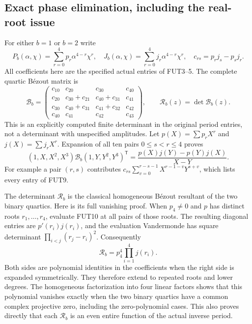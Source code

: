 \subsection{Exact phase elimination, including the real-root issue}
For either $b=1$ or $b=2$ write
\[
 P_b(\alpha,\chi)=\sum_{r=0}^4p_r\alpha^{4-r}\chi^r,
 \quad J_b(\alpha,\chi)=\sum_{r=0}^4j_r\alpha^{4-r}\chi^r,
 \quad c_{rs}=p_rj_s-p_sj_r.
 \tag{FUT8}
\]
All coefficients here are the specified actual entries of FUT3--5.
The complete quartic B\'ezout matrix is
\[
 \mathcal B_b=
 \begin{pmatrix}
 c_{10}&c_{20}&c_{30}&c_{40}\\
 c_{20}&c_{30}+c_{21}&c_{40}+c_{31}&c_{41}\\
 c_{30}&c_{40}+c_{31}&c_{41}+c_{32}&c_{42}\\
 c_{40}&c_{41}&c_{42}&c_{43}
 \end{pmatrix},\qquad
 \mathscr R_b(z)=\det\mathcal B_b(z).
 \tag{FUT9}
\]
This is an explicitly computed finite determinant in the original
period entries, not a determinant with unspecified amplitudes.
Let $p(X)=\sum p_rX^r$ and $j(X)=\sum j_rX^r$.
Expansion of all ten pairs $0\le s<r\le4$ proves
\[
 (1,X,X^2,X^3)\mathcal B_b(1,Y,Y^2,Y^3)^{\mathsf T}
       =\frac{p(X)j(Y)-p(Y)j(X)}{X-Y}.
 \tag{FUT10}
\]
For example a pair $(r,s)$ contributes
$c_{rs}\sum_{v=0}^{r-s-1}X^{r-1-v}Y^{s+v}$,
which lists every entry of FUT9.

The determinant $\mathscr R_b$ is the classical homogeneous B\'ezout
resultant of the two binary quartics. Here is its full vanishing proof.
When $p_4\ne0$ and $p$ has distinct roots $r_1,\ldots,r_4$,
evaluate FUT10 at all pairs of those roots. The resulting diagonal
entries are $p'(r_i)j(r_i)$, and the evaluation Vandermonde has
square determinant $\prod_{i<j}(r_j-r_i)^2$. Consequently
\[
 \mathscr R_b=p_4^4\prod_{i=1}^4j(r_i).
 \tag{FUT11}
\]
Both sides are polynomial identities in the coefficients when the
right side is expanded symmetrically. They therefore extend to repeated
roots and lower degrees. The homogeneous factorization into four
linear factors shows that this polynomial vanishes exactly when the
two binary quartics have a common complex projective zero, including
the zero-polynomial cases. This also proves directly that each
$\mathscr R_b$ is an even entire function of the actual inverse period.


